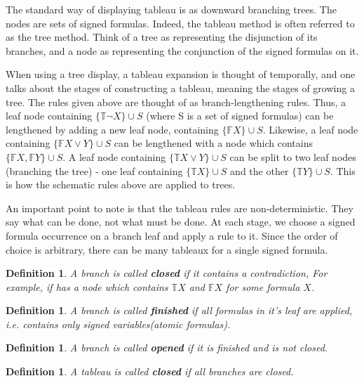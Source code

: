 \documentclass{article}
\newcommand\ST{\mathbb{T}}
\newcommand\SF{\mathbb{F}}
\newtheorem{defn}[theorem]{Definition}
\begin{document}
	\par
	The standard way of displaying tableau is as downward branching trees. The nodes are sets of signed formulas. Indeed, the tableau method is often referred to as the tree method. Think of a tree as representing the disjunction of its branches, and a node as representing the conjunction of the signed formulas on it.

	\par
	When using a tree display, a tableau expansion is thought of temporally, and one talks about the stages of constructing a tableau, meaning the stages of growing a tree. The rules given above are thought of as branch-lengthening rules. Thus, a leaf node containing $\{\ST \neg X \} \cup S$ (where S is a set of signed formulas) can be lengthened by adding a new leaf node, containing $\{\SF X \} \cup S$. Likewise, a leaf node containing $\{\SF X \lor Y \} \cup S$ can be lengthened with a node which contains $\{\SF X, \SF Y \} \cup S$. A leaf node containing $\{\ST X \lor Y \} \cup S$ can be split to two leaf nodes (branching the tree) - one leaf containing $\{\ST X \} \cup S$ and the other $\{\ST Y \} \cup S$. This is how the schematic rules above are applied to trees.
	\par
	An important point to note is that the tableau rules are non-deterministic. They say what can be done, not what must be done. At each stage, we choose a signed formula occurrence on a branch leaf and apply a rule to it. Since the order of choice is arbitrary, there can be many tableaux for a single signed formula.

	\begin{defn}
		A branch is called \textbf{closed} if it contains a contradiction, For example, if has a node which contains $\ST X$ and $\SF X$ for some formula $X$.
	\end{defn}

	\begin{defn}
		A branch is called \textbf{finished} if all formulas in it's leaf are applied, i.e. contains only signed variables(atomic formulas).
	\end{defn}

	\begin{defn}
		A branch is called \textbf{opened} if it is finished and is not closed.
	\end{defn}

	\begin{defn}
		A tableau is called \textbf{closed} if all branches are closed.
	\end{defn}
\end{document}
